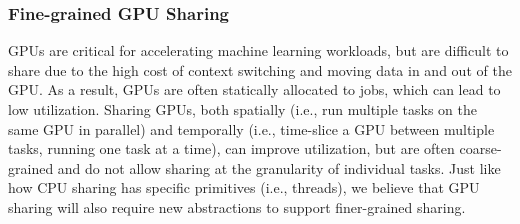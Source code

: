 \subsubsection{Fine-grained GPU Sharing}
GPUs are critical for accelerating machine learning workloads, but are difficult to share due to the high cost of context switching and moving data in and out of the GPU. As a result, GPUs are often statically allocated to jobs, which can lead to low utilization.  Sharing GPUs, both spatially (i.e., run multiple tasks on the same GPU in parallel) and temporally (i.e., time-slice a GPU between multiple tasks, running one task at a time), can improve utilization, but are often coarse-grained and do not allow sharing at the granularity of individual tasks. Just like how CPU sharing has specific primitives (i.e., threads), we believe that GPU sharing will also require new abstractions to support finer-grained sharing. 


